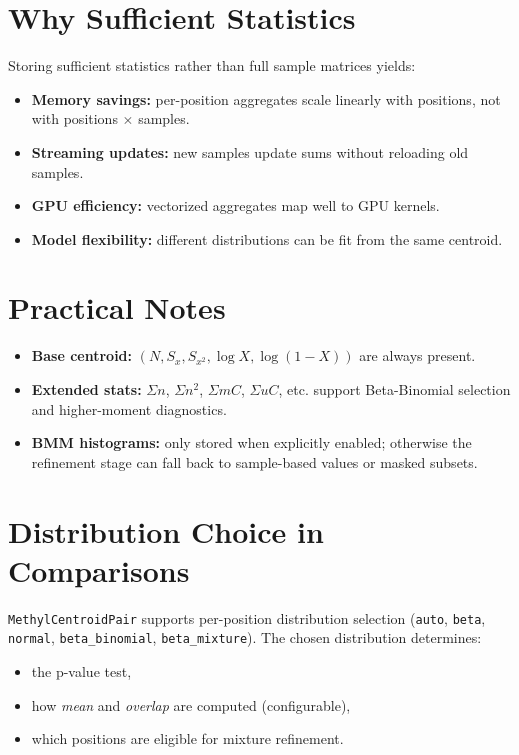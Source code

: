\documentclass[11pt]{article}
\begin{document}
\section{Why Sufficient Statistics}
Storing sufficient statistics rather than full sample matrices yields:
\begin{itemize}
  \item \textbf{Memory savings:} per-position aggregates scale linearly with positions,
        not with positions $\times$ samples.
  \item \textbf{Streaming updates:} new samples update sums without reloading old samples.
  \item \textbf{GPU efficiency:} vectorized aggregates map well to GPU kernels.
  \item \textbf{Model flexibility:} different distributions can be fit from the same centroid.
\end{itemize}

\section{Practical Notes}
\begin{itemize}
  \item \textbf{Base centroid:} $(N, S_x, S_{x^2}, \log X, \log(1-X))$ are always present.
  \item \textbf{Extended stats:} $\Sigma n$, $\Sigma n^2$, $\Sigma mC$, $\Sigma uC$, etc. support
        Beta-Binomial selection and higher-moment diagnostics.
  \item \textbf{BMM histograms:} only stored when explicitly enabled; otherwise the refinement
        stage can fall back to sample-based values or masked subsets.
\end{itemize}

\section{Distribution Choice in Comparisons}
\texttt{MethylCentroidPair} supports per-position distribution selection
(\texttt{auto}, \texttt{beta}, \texttt{normal}, \texttt{beta\_binomial}, \texttt{beta\_mixture}).
The chosen distribution determines:
\begin{itemize}
  \item the p-value test,
  \item how \emph{mean} and \emph{overlap} are computed (configurable),
  \item which positions are eligible for mixture refinement.
\end{itemize}
\end{document}
